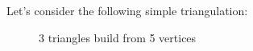 \begin{example}
    Let's consider the following simple triangulation:
    \begin{figure}
        \centering
        \caption{3 triangles build from 5 vertices}
        \label{fig:5-1}
    \end{figure}
\end{example}

